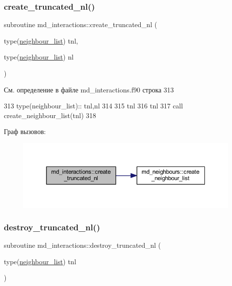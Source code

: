 \subsubsection{\texorpdfstring{create\+\_\+truncated\+\_\+nl()}{create\_truncated\_nl()}}
{\footnotesize\ttfamily subroutine md\+\_\+interactions\+::create\+\_\+truncated\+\_\+nl (\begin{DoxyParamCaption}\item[{type(\mbox{\hyperlink{structmd__general_1_1neighbour__list}{neighbour\+\_\+list}})}]{tnl,  }\item[{type(\mbox{\hyperlink{structmd__general_1_1neighbour__list}{neighbour\+\_\+list}})}]{nl }\end{DoxyParamCaption})}



См. определение в файле md\+\_\+interactions.\+f90 строка 313


\begin{DoxyCode}
313     \textcolor{keywordtype}{type}(neighbour\_list):: tnl,nl
314     
315     tnl%
316     tnl%
317     \textcolor{keyword}{call }create\_neighbour\_list(tnl)
318     
\end{DoxyCode}
Граф вызовов\+:\nopagebreak
\begin{figure}[H]
\begin{center}
\leavevmode
\includegraphics[width=350pt]{namespacemd__interactions_aac3f945d504b95d25098bb5d5d5f4208_cgraph}
\end{center}
\end{figure}
\mbox{\label{namespacemd__interactions_a36f14223ced172ec4c9a9bc381384b55}} 
\subsubsection{\texorpdfstring{destroy\+\_\+truncated\+\_\+nl()}{destroy\_truncated\_nl()}}
{\footnotesize\ttfamily subroutine md\+\_\+interactions\+::destroy\+\_\+truncated\+\_\+nl (\begin{DoxyParamCaption}\item[{type(\mbox{\hyperlink{structmd__general_1_1neighbour__list}{neighbour\+\_\+list}})}]{tnl }\end{DoxyParamCaption})}



